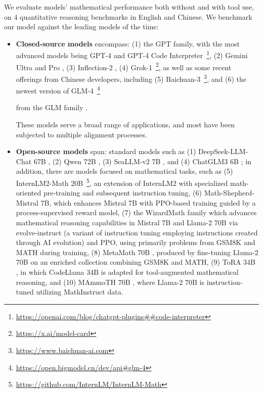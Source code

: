\begin{itemize}[topsep=0pt]
We evaluate models' mathematical performance both without and with tool use, on 4 quantitative reasoning benchmarks in English and Chinese. We benchmark our model against the leading models of the time:

\begin{itemize}[topsep=0pt]
    \item \textbf{Closed-source models} encompass: (1) the GPT family, with the most advanced models being GPT-4 \citep{gpt4} and GPT-4 Code Interpreter~\footnote{\url{https://openai.com/blog/chatgpt-plugins\#\#code-interpreter}}, (2) Gemini Ultra and Pro \citep{gemini}, (3) Inflection-2 \citep{inflection-2}, (4) Grok-1~\footnote{\url{https://x.ai/model-card}},
    as well as some recent offerings from Chinese developers, including (5) Baichuan-3~\footnote{\url{https://www.baichuan-ai.com}},
    and (6) the newest version of GLM-4~\footnote{\url{https://open.bigmodel.cn/dev/api\#glm-4}}

    from the GLM family \citep{glm}.

These models serve a broad range of applications, and most have been subjected to multiple alignment processes.  
\item \textbf{Open-source models} span: standard models such as (1) DeepSeek-LLM-Chat 67B \citep{deepseek-llm}, (2) Qwen 72B \citep{qwen}, (3) SeaLLM-v2 7B \citep{seallm}, and (4) ChatGLM3 6B \citep{chatglm3}; in addition, there are models focused on mathematical tasks, such as (5) InternLM2-Math 20B~\footnote{\url{https://github.com/InternLM/InternLM-Math}}, an extension of InternLM2 with specialized math-oriented pre-training and subsequent instruction tuning, (6) Math-Shepherd-Mistral 7B, which enhances Mistral 7B \citep{mistral} with PPO-based training \citep{schulman2017proximal} guided by a process-supervised reward model, (7) the WizardMath family \citep{wizardmath} which advances mathematical reasoning capabilities in Mistral 7B and Llama-2 70B \citep{llama2} via evolve-instruct (a variant of instruction tuning employing instructions created through AI evolution) and PPO, using primarily problems from GSM8K and MATH during training, (8) MetaMath 70B \citep{metamath}, produced by fine-tuning Llama-2 70B on an enriched collection combining GSM8K and MATH, (9) ToRA 34B \cite{tora}, in which CodeLlama 34B is adapted for tool-augmented mathematical reasoning, and (10) MAmmoTH 70B \citep{MathInstruct}, where Llama-2 70B is instruction-tuned utilizing MathInstruct data.


\end{itemize}
\end{itemize}
